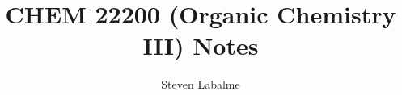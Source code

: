 \documentclass{report}
\title{CHEM 22200 (Organic Chemistry III) Notes}
\author{Steven Labalme}
\begin{document}
\maketitle



\tableofcontents
\newpage
\listoffigures
\newpage



\pagestyle{main}
\renewcommand{\chaptermark}[1]{\markboth{\chaptername\ \thechapter\ (#1)}{}}
\setcounter{chapter}{15}




\renewcommand{\chaptermark}[1]{\markboth{\chaptername\ \thechapter\ (Carbonyl Compounds' \texorpdfstring{$\alpha$}{TEXT}-Carbons)}{}}

\renewcommand{\chaptermark}[1]{\markboth{\chaptername\ \thechapter\ (#1)}{}}

\printbibliography[heading=bibintoc]
\end{document}
